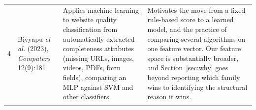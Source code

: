 \begin{longtable}{@{}p{0.4cm}p{3.1cm}p{5.4cm}p{6.2cm}@{}}
4 & \small Biyyapu \emph{et al.} (2023), \emph{Computers} 12(9):181 & \small Applies machine learning to website quality classification from automatically extracted completeness attributes (missing URLs, images, videos, PDFs, form fields), comparing an MLP against SVM and other classifiers. & \small Motivates the move from a fixed rule-based score to a learned model, and the practice of comparing several algorithms on one feature vector. Our feature space is substantially broader, and Section~\ref{sec:why} goes beyond reporting which family wins to identifying the structural reason it wins. \\\addlinespace[3pt]
\end{longtable}
